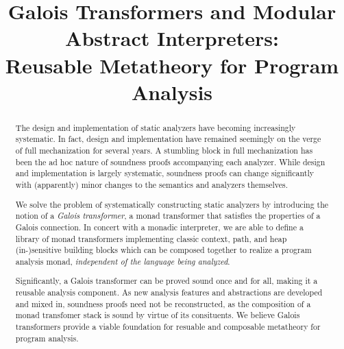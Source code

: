 \documentclass[pldi,nocopyrightspace]{sigplanconf}
\begin{document}
\setlength{\abovedisplayskip}{0em}
\setlength{\belowdisplayskip}{0em}
\setlength{\abovedisplayshortskip}{0em}
\setlength{\belowdisplayshortskip}{0em}

\title{Galois Transformers and Modular Abstract Interpreters:\\ Reusable Metatheory for Program Analysis}
\maketitle

\begin{abstract}

The design and implementation of static analyzers have becoming
increasingly systematic.  In fact, design and implementation have
remained seemingly on the verge of full mechanization for several
years.  A stumbling block in full mechanization has been the ad hoc
nature of soundness proofs accompanying each analyzer.  While design
and implementation is largely systematic, soundness proofs can change
significantly with (apparently) minor changes to the semantics and
analyzers themselves.

\par We solve the problem of systematically constructing static
analyzers by introducing the notion of a \emph{Galois transformer}, a
monad transformer that satisfies the properties of a Galois
connection.  In concert with a monadic interpreter, we are able to
define a library of monad transformers implementing classic context,
path, and heap (in-)sensitive building blocks which can be composed
together to realize a program analysis monad, \emph{independent of the
  language being analyzed}.

\par Significantly, a Galois transformer can be proved sound once and
for all, making it a reusable analysis component.  As new analysis
features and abstractions are developed and mixed in, soundness proofs
need not be reconstructed, as the composition of a monad transfomer
stack is sound by virtue of its consituents.  We believe Galois
transformers provide a viable foundation for resuable and composable 
metatheory for program analysis.
\end{abstract}





\end{document}
